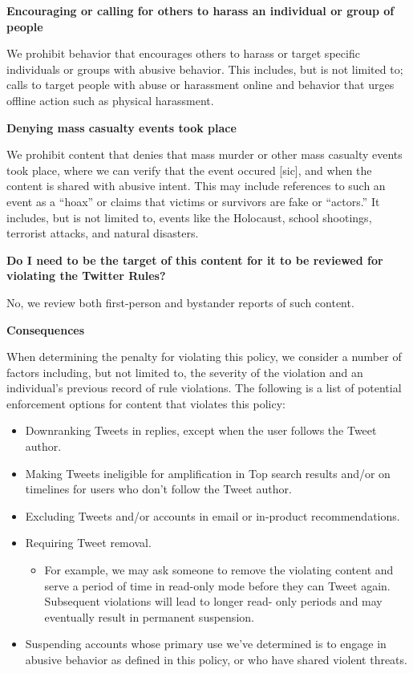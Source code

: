 \vspace{.5em}\noindent\textbf{Encouraging or calling for others to harass an
    individual or group of people}

\noindent We prohibit behavior that encourages others to harass or target
specific individuals or groups with abusive behavior. This includes, but is not
limited to; calls to target people with abuse or harassment online and behavior
that urges offline action such as physical harassment.


\vspace{.5em}\noindent\textbf{Denying mass casualty events took place}

\noindent We prohibit content that denies that mass murder or other mass
casualty events took place, where we can verify that the event occured [sic],
and when the content is shared with abusive intent. This may include references
to such an event as a ``hoax'' or claims that victims or survivors are fake or
``actors.'' It includes, but is not limited to, events like the Holocaust,
school shootings, terrorist attacks, and natural disasters.


\vspace{.5em}\noindent\textbf{Do I need to be the target of this content for it
    to be reviewed for violating the Twitter Rules?}

\noindent No, we review both first-person and bystander reports of such content.


\vspace{.5em}\noindent\textbf{Consequences}

\noindent When determining the penalty for violating this policy, we consider a
number of factors including, but not limited to, the severity of the violation
and an individual's previous record of rule violations. The following is a list
of potential enforcement options for content that violates this policy:

\begin{itemize}
\item Downranking Tweets in replies, except when the user follows the Tweet author.
\item Making Tweets ineligible for amplification in Top search results and/or on timelines for users who don't follow the Tweet author.
\item Excluding Tweets and/or accounts in email or in-product recommendations.
\item Requiring Tweet removal.
    \begin{itemize}
    \item For example, we may ask someone to remove the violating content
        and serve a period of time in read-only mode before they can Tweet
        again. Subsequent violations will lead to longer read- only periods
        and may eventually result in permanent suspension.
    \end{itemize}
\item Suspending accounts whose primary use we've determined is to engage in abusive behavior as defined in this policy, or who have shared violent threats.
\end{itemize}

